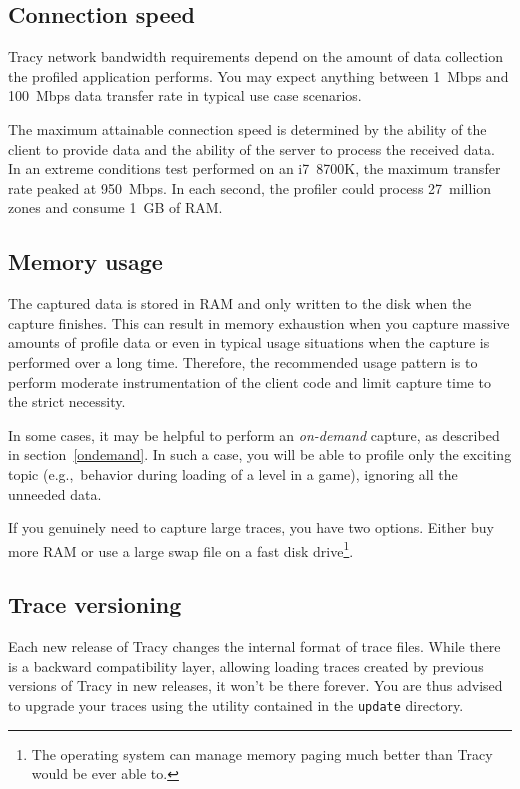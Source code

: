 \documentclass[hidelinks,titlepage,a4paper,twoside]{article}
\begin{document}
\subsection{Connection speed}

Tracy network bandwidth requirements depend on the amount of data collection the profiled application performs. You may expect anything between 1~Mbps and 100~Mbps data transfer rate in typical use case scenarios.

The maximum attainable connection speed is determined by the ability of the client to provide data and the ability of the server to process the received data. In an extreme conditions test performed on an i7~8700K, the maximum transfer rate peaked at 950~Mbps. In each second, the profiler could process 27~million zones and consume 1~GB of RAM.

\subsection{Memory usage}

The captured data is stored in RAM and only written to the disk when the capture finishes. This can result in memory exhaustion when you capture massive amounts of profile data or even in typical usage situations when the capture is performed over a long time. Therefore, the recommended usage pattern is to perform moderate instrumentation of the client code and limit capture time to the strict necessity.

In some cases, it may be helpful to perform an \emph{on-demand} capture, as described in section~\ref{ondemand}. In such a case, you will be able to profile only the exciting topic (e.g.,\ behavior during loading of a level in a game), ignoring all the unneeded data.

If you genuinely need to capture large traces, you have two options. Either buy more RAM or use a large swap file on a fast disk drive\footnote{The operating system can manage memory paging much better than Tracy would be ever able to.}.

\subsection{Trace versioning}

Each new release of Tracy changes the internal format of trace files. While there is a backward compatibility layer, allowing loading traces created by previous versions of Tracy in new releases, it won't be there forever. You are thus advised to upgrade your traces using the utility contained in the \texttt{update} directory.
\end{document}
